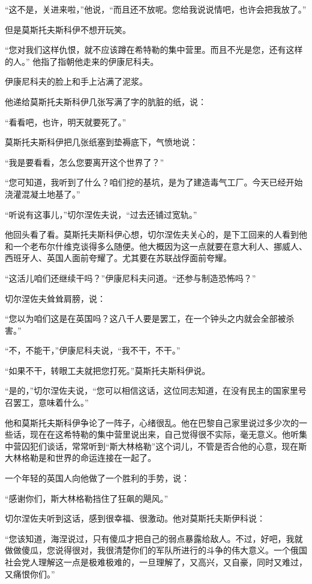 “这不是，关进来啦，”他说，“而且还不放呢。您给我说说情吧，也许会把我放了。”

但是莫斯托夫斯科伊不想开玩笑。

“您对我们这样仇恨，就不应该蹲在希特勒的集中营里。而且不光是您，还有这样的人。” 他指了指朝他走来的伊康尼科夫。

伊康尼科夫的脸上和手上沾满了泥浆。

他递给莫斯托夫斯科伊几张写满了字的肮脏的纸，说：

“看看吧，也许，明天就要死了。”

莫斯托夫斯科伊把几张纸塞到垫褥底下，气愤地说：

“我是要看看，怎么您要离开这个世界了？”

“您可知道，我听到了什么？咱们挖的基坑，是为了建造毒气工厂。今天已经开始浇灌混凝土地基了。”

“听说有这事儿，”切尔涅佐夫说，“过去还铺过宽轨。”

他回头看了看。莫斯托夫斯科伊心想，切尔涅佐夫关心的，是下工回来的人看到他和一个老布尔什维克谈得多么随便。他大概因为这一点就要在意大利人、挪威人、西班牙人、英国人面前夸耀了。尤其要在苏联战俘面前夸耀。

“这活儿咱们还继续干吗？”伊康尼科夫问道。“还参与制造恐怖吗？”

切尔涅佐夫耸耸肩膀，说：

“您以为咱们这是在英国吗？这八千人要是罢工，在一个钟头之内就会全部被杀害。”

“不，不能干，”伊康尼科夫说，“我不干，不干。”

“如果不干，转眼工夫就把您打死。”莫斯托夫斯科伊说。

“是的，”切尔涅佐夫说，“您可以相信这话，这位同志知道，在没有民主的国家里号召罢工，意味着什么。”

他和莫斯托夫斯科伊争论了一阵子，心绪很乱。他在巴黎自己家里说过多少次的一些话，现在在这希特勒的集中营里说出来，自己觉得很不实际，毫无意义。他听集中营囚犯们谈话，常常听到“斯大林格勒”这个词儿，不管是否合他的心意，现在斯大林格勒是和世界的命运连接在一起了。

一个年轻的英国人向他做了一个胜利的手势，说：

“感谢你们，斯大林格勒挡住了狂飙的飓风。”

切尔涅佐夫听到这话，感到很幸福、很激动。他对莫斯托夫斯伊科说：

“您该知道，海涅说过，只有傻瓜才把自己的弱点暴露给敌人。不过，好吧，我就做做傻瓜，您说得很对，我很清楚你们的军队所进行的斗争的伟大意义。一个俄国社会党人理解这一点是极难极难的，一旦理解了，又高兴，又自豪，同时又难过，又痛恨你们。”

